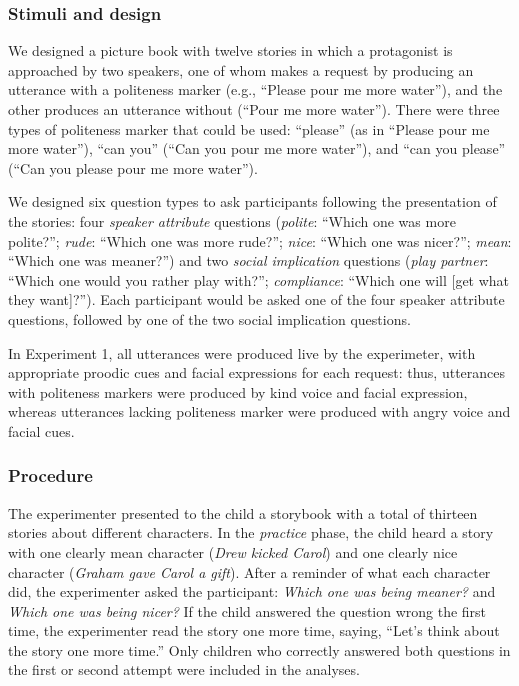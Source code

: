 \documentclass[10pt, letterpaper]{article}
\begin{document}
\subsubsection{Stimuli and design}\label{stimuli-and-design}

We designed a picture book with twelve stories in which a protagonist is
approached by two speakers, one of whom makes a request by producing an
utterance with a politeness marker (e.g., ``Please pour me more
water''), and the other produces an utterance without (``Pour me more
water''). There were three types of politeness marker that could be
used: ``please'' (as in ``Please pour me more water''), ``can you''
(``Can you pour me more water''), and ``can you please'' (``Can you
please pour me more water'').

We designed six question types to ask participants following the
presentation of the stories: four \emph{speaker attribute} questions
(\emph{polite}: ``Which one was more polite?''; \emph{rude}: ``Which one
was more rude?''; \emph{nice}: ``Which one was nicer?''; \emph{mean}:
``Which one was meaner?'') and two \emph{social implication} questions
(\emph{play partner}: ``Which one would you rather play with?'';
\emph{compliance}: ``Which one will {[}get what they want{]}?''). Each
participant would be asked one of the four speaker attribute questions,
followed by one of the two social implication questions.

In Experiment 1, all utterances were produced live by the experimeter,
with appropriate proodic cues and facial expressions for each request:
thus, utterances with politeness markers were produced by kind voice and
facial expression, whereas utterances lacking politeness marker were
produced with angry voice and facial cues.

\subsubsection{Procedure}\label{procedure}

The experimenter presented to the child a storybook with a total of
thirteen stories about different characters. In the \emph{practice}
phase, the child heard a story with one clearly mean character
(\emph{Drew kicked Carol}) and one clearly nice character (\emph{Graham
gave Carol a gift}). After a reminder of what each character did, the
experimenter asked the participant: \emph{Which one was being meaner?}
and \emph{Which one was being nicer?} If the child answered the question
wrong the first time, the experimenter read the story one more time,
saying, ``Let's think about the story one more time.'' Only children who
correctly answered both questions in the first or second attempt were
included in the analyses.
\end{document}
